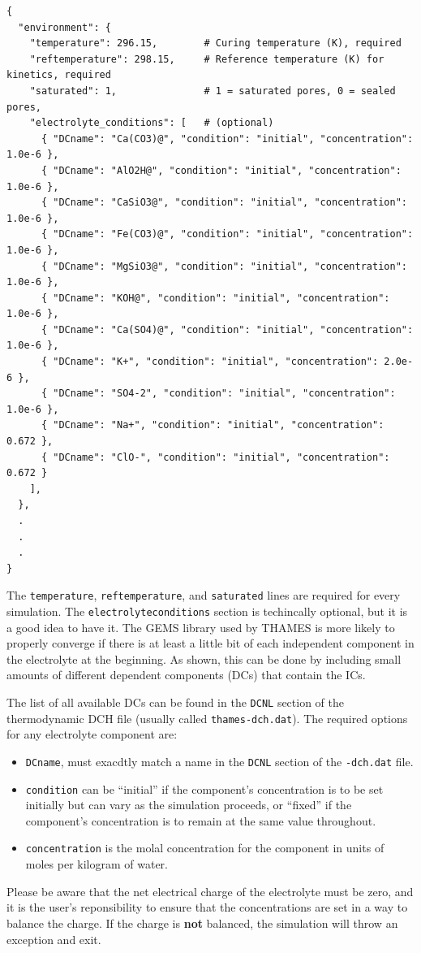 \documentclass{article}
\newcommand{\us}{\underline{\phantom{X}}}
\begin{document}
\scriptsize{
	\begin{lstlisting}
{
  "environment": {
    "temperature": 296.15,        # Curing temperature (K), required
    "reftemperature": 298.15,     # Reference temperature (K) for kinetics, required
    "saturated": 1,               # 1 = saturated pores, 0 = sealed pores,
    "electrolyte_conditions": [   # (optional)
      { "DCname": "Ca(CO3)@", "condition": "initial", "concentration": 1.0e-6 },
      { "DCname": "AlO2H@", "condition": "initial", "concentration": 1.0e-6 },
      { "DCname": "CaSiO3@", "condition": "initial", "concentration": 1.0e-6 },
      { "DCname": "Fe(CO3)@", "condition": "initial", "concentration": 1.0e-6 },
      { "DCname": "MgSiO3@", "condition": "initial", "concentration": 1.0e-6 },
      { "DCname": "KOH@", "condition": "initial", "concentration": 1.0e-6 },
      { "DCname": "Ca(SO4)@", "condition": "initial", "concentration": 1.0e-6 },
      { "DCname": "K+", "condition": "initial", "concentration": 2.0e-6 },
      { "DCname": "SO4-2", "condition": "initial", "concentration": 1.0e-6 },
      { "DCname": "Na+", "condition": "initial", "concentration": 0.672 },
      { "DCname": "ClO-", "condition": "initial", "concentration": 0.672 }
    ],
  },
  .
  .
  .
}
\end{lstlisting}
}

\normalsize{ }
The \verb!temperature!, \verb!reftemperature!, and \verb!saturated! lines
are required for every simulation. The \texttt{electrolyte{\us}conditions} section
is techincally optional, but it is a good idea to have it. The GEMS library
used by THAMES is more likely to properly converge if there is at least a little
bit of each independent component in the electrolyte at the beginning. As shown,
this can be done by including small amounts of different dependent components
(DCs) that contain the ICs.

The list of all available DCs can be found in the \verb!DCNL! section of the
thermodynamic DCH file (usually called \verb!thames-dch.dat!).
The required options for any electrolyte component are:
\begin{itemize}
	\item \verb!DCname!, must exacdtly match a name in the \verb!DCNL! section
	      of the \verb!-dch.dat! file.
	\item \verb!condition! can be ``initial'' if the component's concentration
	      is to be set initially but can vary as the simulation proceeds, or ``fixed''
	      if the component's concentration is to remain at the same value throughout.
	\item \verb!concentration! is the molal concentration for the component in
	      units of moles per kilogram of water.
\end{itemize}
Please be aware that the net electrical charge of the electrolyte must
be zero, and it is the user's reponsibility to ensure that the concentrations
are set in a way to balance the charge. If the charge is \textbf{not} balanced,
the simulation will throw an exception and exit.
\end{document}
